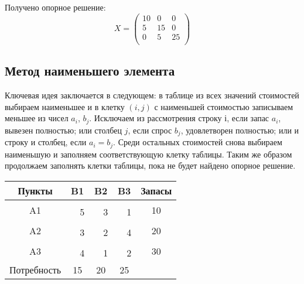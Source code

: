 \documentclass[a4paper,12pt]{article}
\begin{document}
	Получено опорное решение:
	\begin{equation}
		X = 
		\begin{pmatrix}
			10 & 0 & 0 \\
			5 & 15 & 0 \\
			0 & 5 & 25 \\ 
		\end{pmatrix}
	\end{equation}
	\clearpage
	
	\subsection{Метод наименьшего элемента}
	
	Ключевая идея заключается в следующем: в таблице из всех значений стоимостей выбираем наименьшее и в клетку $(i,j)$ с наименьшей стоимостью записываем меньшее из чисел $a_i$, $b_j$. Исключаем из рассмотрения строку $і$, если запас $a_i$, вывезен полностью; или столбец $j$, если спрос $b_j$, удовлетворен полностью; или и строку и столбец, если $a_i = b_j$. Среди остальных стоимостей снова выбираем наименьшую и заполняем соответствующую клетку таблицы. Таким же образом продолжаем заполнять клетки таблицы, пока не будет найдено опорное решение. 
	
	\begin{center}
		\begin{tabular}{|c|c|c|c|c|c|c|c}
			\hline
			Пункты & \multicolumn{2}{c|}{B1} & \multicolumn{2}{c|}{B2} & \multicolumn{2}{c|}{B3} & \multicolumn{1}{c|}{Запасы} \\ \hline
			\multirow{2}{*}{A1} & \multicolumn{2}{c|}{\textbf{}} & \multicolumn{2}{c|}{} & \multicolumn{2}{c|}{} & \multicolumn{1}{c|}{\multirow{2}{*}{10}} \\ \cline{2-7}
			&  & 5 &  & 3 &  & 1 & \multicolumn{1}{c|}{} \\ \hline
			\multirow{2}{*}{A2} & \multicolumn{2}{c|}{\textbf{}} & \multicolumn{2}{c|}{\textbf{}} & \multicolumn{2}{c|}{} & \multicolumn{1}{c|}{\multirow{2}{*}{20}} \\ \cline{2-7}
			&  & 3 &  & 2 &  & 4 & \multicolumn{1}{c|}{} \\ \hline
			\multirow{2}{*}{A3} & \multicolumn{2}{c|}{} & \multicolumn{2}{c|}{\textbf{}} & \multicolumn{2}{c|}{\textbf{}} & \multicolumn{1}{c|}{\multirow{2}{*}{30}} \\ \cline{2-7}
			&  & 4 &  & 1 &  & 2 & \multicolumn{1}{c|}{} \\ \hline
			Потребность & \multicolumn{2}{c|}{15} & \multicolumn{2}{c|}{20} & \multicolumn{2}{c|}{25} &  \\ \cline{1-7}
		\end{tabular}
	\end{center}
\end{document}
